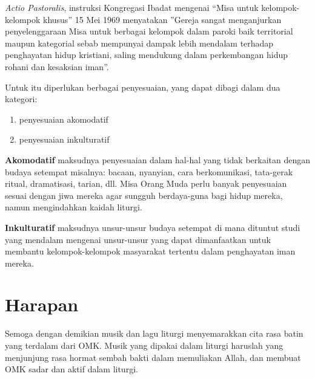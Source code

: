 \textit{Actio Pastoralis}, instruksi Kongregasi Ibadat mengenai “Misa untuk kelompok-kelompok khusus” 15 Mei 1969 menyatakan ”Gereja sangat menganjurkan penyelenggaraan Misa untuk berbagai kelompok dalam paroki baik territorial maupun kategorial sebab mempunyai dampak lebih mendalam terhadap penghayatan hidup kristiani, saling mendukung dalam perkembangan hidup rohani dan kesaksian iman”.

Untuk itu diperlukan berbagai penyesuaian, yang dapat dibagi dalam dua kategori:
\begin{enumerate}
\item penyesuaian akomodatif
\item penyesuaian inkulturatif
\end{enumerate}

\textbf{Akomodatif}  maksudnya penyesuaian dalam hal-hal yang tidak berkaitan dengan budaya setempat misalnya: bacaan, nyanyian, cara berkomunikasi, tata-gerak ritual, dramatisasi, tarian,  dll. Misa Orang Muda perlu banyak penyesuaian sesuai dengan jiwa mereka agar sungguh berdaya-guna bagi hidup mereka, namun mengindahkan kaidah liturgi.

\textbf{Inkulturatif} maksudnya  unsur-unsur budaya setempat di mana dituntut studi yang mendalam mengenai unsur-unsur yang dapat dimanfaatkan untuk membantu kelompok-kelompok masyarakat tertentu dalam penghayatan iman mereka.

\section*{Harapan}

Semoga dengan demikian musik dan lagu liturgi menyemarakkan cita rasa batin yang terdalam dari OMK. Musik yang dipakai dalam liturgi haruslah yang menjunjung rasa hormat sembah bakti dalam memuliakan Allah, dan membuat OMK sadar dan aktif dalam liturgi.


